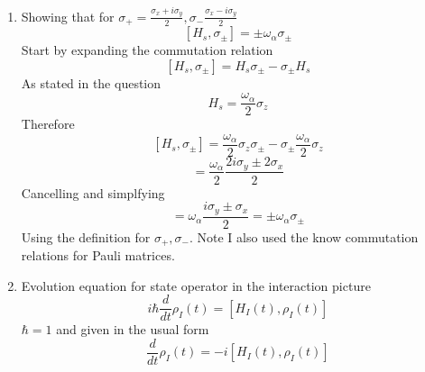 \documentclass[12pt]{article}
\begin{document}
\begin{enumerate}
    \item Showing that for $\sigma_+ = \frac{\sigma_x + i \sigma_y}{2}, \sigma_- \frac{\sigma_x - i \sigma_y}{2}$
    $$ [H_s, \sigma_{\pm} ] = \pm \omega_{\alpha} \sigma_{\pm} $$
    Start by expanding the commutation relation 
    $$ [H_s, \sigma_{\pm} ] = H_s \sigma_{\pm} - \sigma_{\pm} H_s $$
    As stated in the question 
    $$ H_s = \frac{\omega_{\alpha}} {2} \sigma_z $$
    Therefore 
    $$ [H_s, \sigma_{\pm} ] = \frac{\omega_{\alpha}}{2} \sigma_z \sigma_{\pm} - \sigma_{\pm} \frac{\omega_{\alpha}}{2} \sigma_z $$
    $$ = \frac{\omega_{\alpha}}{2} \frac{2i \sigma_y \pm 2 \sigma_x}{2} $$
    Cancelling and simplfying 
    $$ = \omega_{\alpha} \frac{i \sigma_y \pm \sigma_x}{2} = \pm \omega_{\alpha} \sigma_{\pm} $$
    Using the definition for $\sigma_+, \sigma_-$. Note I also used the know commutation relations for Pauli matrices. 

    \item Evolution equation for state operator in the interaction picture 
    $$ i \hbar \frac{d}{dt} \rho_I (t) = [H_I (t), \rho_I (t) ] $$
    $\hbar = 1 $ and given in the usual form
    \begin{equation}\label{eq1}
        \frac{d}{dt} \rho_I (t) = -i [ H_I (t), \rho_I (t) ]
    \end{equation}

\end{enumerate}
\end{document}

